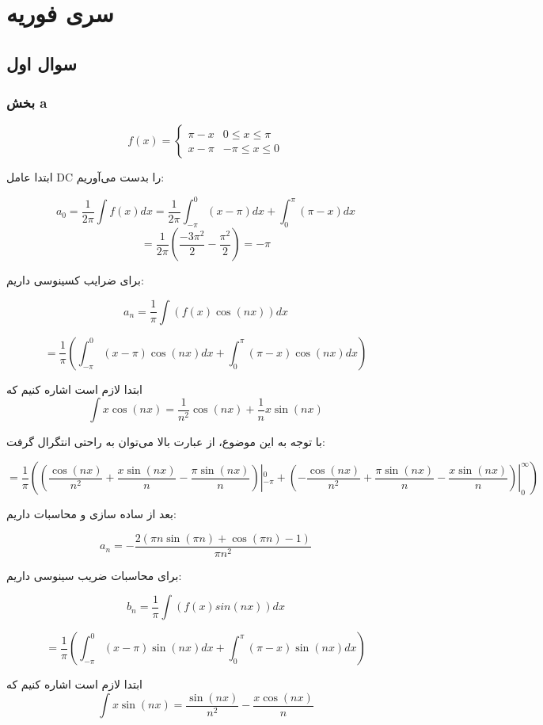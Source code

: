 \documentclass[12pt]{article}
\begin{document}
\KashidaOff

\section{سری فوریه}
\subsection{سوال اول}

\subsubsection{بخش a}


$$
f(x)=\left\{\begin{array}{lr}
	\pi-x & 0 \leq x \leq \pi \\
	x-\pi & -\pi \leq x \leq 0
\end{array}\right.
$$

ابتدا عامل DC را بدست می‌آوریم:

$$a_0 = \frac{1}{2\pi} \int f(x) dx = \frac{1}{2\pi} \int_{-\pi}^{0} (x- \pi) dx + \int_{0}^{\pi} (\pi -x) dx$$
$$= \frac{1}{2\pi} (\frac{-3\pi^2}{2} - \frac{\pi^2}{2}) = \boxed{- \pi} $$

برای ضرایب کسینوسی داریم:

$$a_n = \frac{1}{\pi} \int (f(x) \cos (nx)) dx$$

$$= \frac{1}{\pi} (\int_{-\pi}^{0} (x - \pi) \cos (nx) dx + \int_{0}^{\pi} (\pi - x) \cos (nx) dx)$$

ابتدا لازم است اشاره کنیم که
$$\int x \cos (nx) = \frac{1}{n^2} \cos(nx) + \frac{1}{n} x \sin (nx)$$

با توجه به این موضوع، از عبارت بالا می‌توان به راحتی انتگرال گرفت:


$$= \frac{1}{\pi}( (\frac{\cos (n x)}{n^2}+\frac{x \sin (n x)}{n}-\frac{\pi  \sin (n x)}{n}) |_{-\pi}^{0} + (-\frac{\cos (n x)}{n^2}+\frac{\pi  \sin (n x)}{n}-\frac{x \sin (n x)}{n})|_{0}^{\infty})$$

بعد از ساده سازی و محاسبات داریم:

$$\boxed{a_n = -\frac{2 (\pi  n \sin (\pi  n)+\cos (\pi  n)-1)}{\pi  n^2}}$$


برای محاسبات ضریب سینوسی داریم:

$$b_n = \frac{1}{\pi} \int (f(x) sin(nx)) dx$$

$$= \frac{1}{\pi} (\int_{-\pi}^{0} (x - \pi) \sin (nx) dx + \int_{0}^{\pi} (\pi - x) \sin (nx) dx)$$


ابتدا لازم است اشاره کنیم که
$$\int x \sin(nx) = \frac{\sin (n x)}{n^2}-\frac{x \cos (n x)}{n} $$
\end{document}
